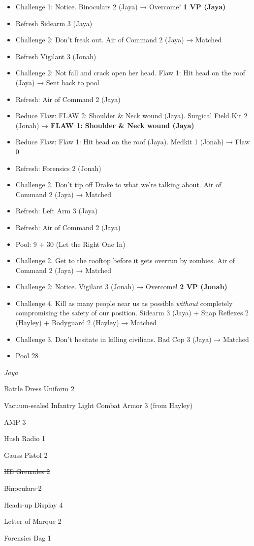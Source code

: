 \begin{itemize}
\item Challenge 1: Notice.  Binoculars 2 (Jaya) → Overcome! \textbf{1 VP (Jaya)}
\item Refresh Sidearm 3 (Jaya)
\item Challenge 2: Don't freak out. Air of Command 2 (Jaya) → Matched
\item Refresh Vigilant 3 (Jonah)
\item Challenge 2: Not fall and crack open her head.  Flaw 1: Hit head on the roof (Jaya)\textbf{ }→ Sent back to pool
\item Refresh: Air of Command 2 (Jaya)
\item Reduce Flaw: FLAW 2: Shoulder \& Neck wound (Jaya). {\color[RGB]{255,0,0}  } Surgical Field Kit 2 (Jonah) → \textbf{ {\color[RGB]{255,0,0}FLAW 1: Shoulder \& Neck wound (Jaya)} }
\item Reduce Flaw: Flaw 1: Hit head on the roof (Jaya).  Medkit 1 (Jonah) → Flaw 0
\item Refresh: Forensics 2 (Jonah)
\item Challenge 2.  Don't tip off Drake to what we're talking about.  Air of Command 2 (Jaya) → Matched
\item Refresh: Left Arm 3 (Jaya)
\item Refresh: Air of Command 2 (Jaya)
\item Pool: 9 + 30 (Let the Right One In)
\item Challenge 2.  Get to the rooftop before it gets overrun by zombies.  Air of Command 2 (Jaya) → Matched
\item Challenge 2: Notice.  Vigilant 3 (Jonah) → Overcome! \textbf{2 VP (Jonah)}
\item Challenge 4. Kill as many people near us as possible \textit{without} completely compromising the safety of our position.  Sidearm 3 (Jaya) + Snap Reflexes 2 (Hayley) + Bodyguard 2 (Hayley) → Matched
\item Challenge 3.  Don't hesitate in killing civilians.  Bad Cop 3 (Jaya) → Matched
\item Pool 28
\end{itemize}





\textit{Jaya}

{\parskip=0pt
Battle Dress Uniform 2

Vacuum-sealed Infantry Light Combat Armor 3 (from Hayley)

AMP 3

Hush Radio 1

Gauss Pistol 2

\sout{ HE Grenades 2 }

\sout{ Binoculars 2 }

Heads-up Display 4

Letter of Marque 2

Forensics Bag 1
}


